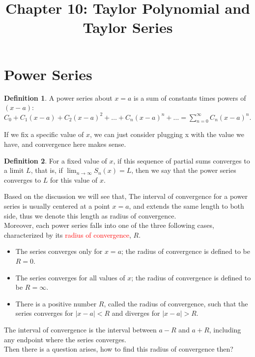 \documentclass[12pt]{article}
\date{}
\title{Chapter 10: Taylor Polynomial and Taylor Series}
\theoremstyle{definition}
\theoremstyle{definition}
\newtheorem{definition}{Definition}[section]
\theoremstyle{remark}
\theoremstyle{definition}
\theoremstyle{definition}
\theoremstyle{definition}
\begin{document}
\maketitle
\section{Power Series}
\begin{definition}
	A power series about $x = a$ is a sum of constants times powers of $(x - a)$: 
	$C_0 + C_1(x - a) + C_2(x - a)^2 + \ldots + C_n(x - a)^n + \ldots =	\sum_{n
	=0}^{\infty}	C_n(x - a)^n$.
\end{definition}

If we fix a specific value of $x$, we can just consider plugging x with the value we have, and convergence here makes sense.

\begin{definition}
For a fixed value of $x$, if this sequence of partial sums converges to a limit $L$, that is, if
$\lim_{n \to \infty}S_n(x) = L$, then we say that the power series converges to $L$ for this value of $x$.
\end{definition}

Based on the discussion we will see that, The interval of convergence for a power series is usually centered at a point $x=a$, and extends the same length to both side, thus we denote this length as radius of convergence.\\

Moreover, each power series falls into one of the three following cases, characterized by its \textcolor{red}{radius of convergence}, $R$.
\begin{itemize}
\item The series converges only for $x = a$; the radius of convergence is defined to be $R = 0$.
\item The series converges for all values of $x$; the radius of convergence is defined to be
$R = \infty$.
\item There is a positive number $R$, called the radius of convergence, such that the series
converges for $|x - a| < R$ and diverges for $|x - a| > R$. 
\end{itemize}
The interval of convergence is the interval between $a - R$ and $a + R$, including any
endpoint where the series converges.
\\

Then there is a question arises, how to find this radius of convergence then?\\
\end{document}
